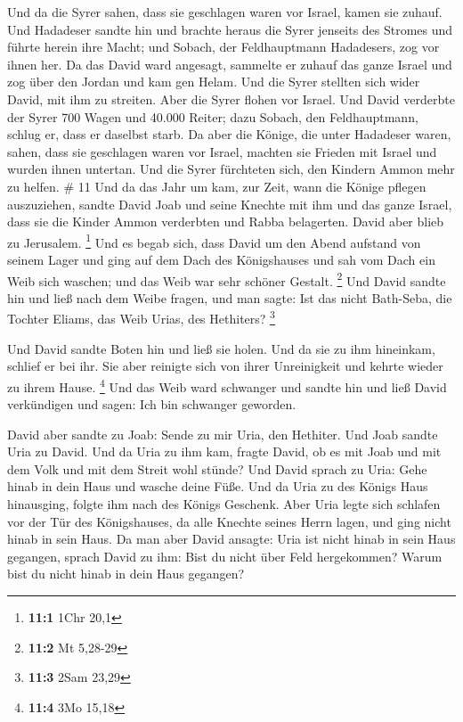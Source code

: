  Und da die Syrer sahen, dass sie geschlagen waren vor
Israel, kamen sie zuhauf.  Und Hadadeser sandte hin und
brachte heraus die Syrer jenseits des Stromes und führte herein ihre
Macht; und Sobach, der Feldhauptmann Hadadesers, zog vor ihnen her.
 Da das David ward angesagt, sammelte er zuhauf das ganze
Israel und zog über den Jordan und kam gen Helam. Und die Syrer stellten
sich wider David, mit ihm zu streiten.  Aber die Syrer
flohen vor Israel. Und David verderbte der Syrer 700 Wagen und 40.000
Reiter; dazu Sobach, den Feldhauptmann, schlug er, dass er daselbst
starb.  Da aber die Könige, die unter Hadadeser waren,
sahen, dass sie geschlagen waren vor Israel, machten sie Frieden mit
Israel und wurden ihnen untertan. Und die Syrer fürchteten sich, den
Kindern Ammon mehr zu helfen. \# 11  Und da das Jahr um kam,
zur Zeit, wann die Könige pflegen auszuziehen, sandte David Joab und
seine Knechte mit ihm und das ganze Israel, dass sie die Kinder Ammon
verderbten und Rabba belagerten. David aber blieb zu Jerusalem.
\footnote{\textbf{11:1} 1Chr 20,1}  Und es begab sich, dass
David um den Abend aufstand von seinem Lager und ging auf dem Dach des
Königshauses und sah vom Dach ein Weib sich waschen; und das Weib war
sehr schöner Gestalt. \footnote{\textbf{11:2} Mt 5,28-29} 
Und David sandte hin und ließ nach dem Weibe fragen, und man sagte: Ist
das nicht Bath-Seba, die Tochter Eliams, das Weib Urias, des Hethiters?
\footnote{\textbf{11:3} 2Sam 23,29}

 Und David sandte Boten hin und ließ sie holen. Und da sie
zu ihm hineinkam, schlief er bei ihr. Sie aber reinigte sich von ihrer
Unreinigkeit und kehrte wieder zu ihrem Hause. \footnote{\textbf{11:4}
  3Mo 15,18}  Und das Weib ward schwanger und sandte hin und
ließ David verkündigen und sagen: Ich bin schwanger geworden.

 David aber sandte zu Joab: Sende zu mir Uria, den Hethiter.
Und Joab sandte Uria zu David.  Und da Uria zu ihm kam,
fragte David, ob es mit Joab und mit dem Volk und mit dem Streit wohl
stünde?  Und David sprach zu Uria: Gehe hinab in dein Haus
und wasche deine Füße. Und da Uria zu des Königs Haus hinausging, folgte
ihm nach des Königs Geschenk.  Aber Uria legte sich schlafen
vor der Tür des Königshauses, da alle Knechte seines Herrn lagen, und
ging nicht hinab in sein Haus.  Da man aber David ansagte:
Uria ist nicht hinab in sein Haus gegangen, sprach David zu ihm: Bist du
nicht über Feld hergekommen? Warum bist du nicht hinab in dein Haus
gegangen?

